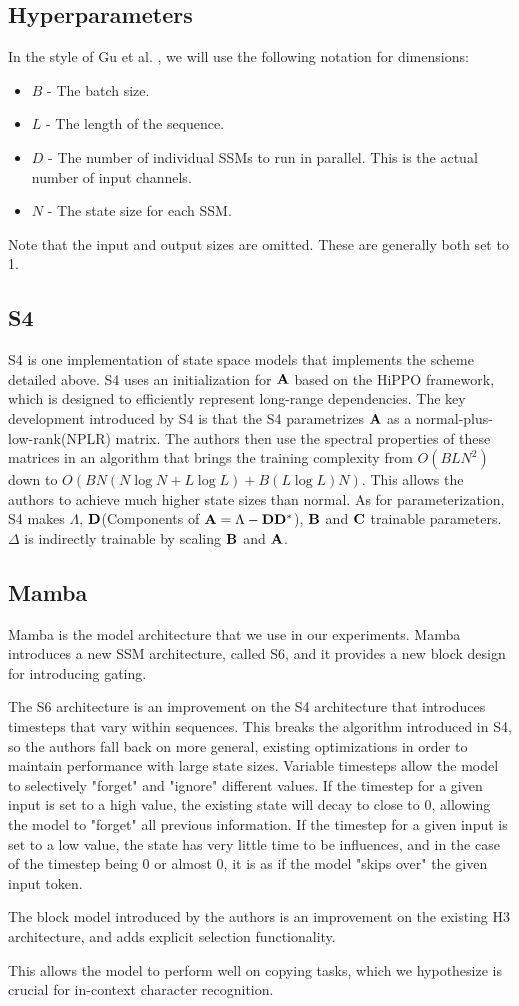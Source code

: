 \subsection{Hyperparameters}
In the style of Gu et al. \cite{s4}, we will use the following notation for
dimensions:
\begin{itemize}
    \item $B$ - The batch size.
    \item $L$ - The length of the sequence.
    \item $D$ - The number of individual SSMs to run in parallel. This is the
    actual number of input channels.
    \item $N$ - The state size for each SSM.
\end{itemize}
Note that the input and output sizes are omitted.
These are generally both set to 1.

\subsection{S4}
S4\cite{s4} is one implementation of state space models that implements the
scheme detailed above.
S4 uses an initialization for ${\mathbf{A}}$ based on the HiPPO framework, which is
designed to efficiently represent long-range dependencies.
The key development introduced by S4 is that the S4 parametrizes ${\mathbf{A}}$ as a
normal-plus-low-rank(NPLR) matrix. The authors then use the spectral properties
of these matrices in an algorithm that brings the training complexity from
$O(BLN^2)$ down to $O(BN(N \log N + L \log L) + B(L \log L)N)$\cite{s4}.
This allows the authors to achieve much higher state sizes than normal.
As for parameterization, S4 makes $\Lambda$, ${\mathbf{D}}$(Components of
${\mathbf{A}} = \Lambda - {\mathbf{D}}{\mathbf{D}}^*$), ${\mathbf{B}}$ and ${\mathbf{C}}$ trainable parameters.
$\Delta$ is indirectly trainable by scaling ${\mathbf{B}}$ and ${\mathbf{A}}$.

\subsection{Mamba}
Mamba\cite{mamba} is the model architecture that we use in our experiments.
Mamba introduces a new SSM architecture, called S6, and it provides a new block
design for introducing gating.

The S6 architecture is an improvement on the S4 architecture that introduces
timesteps that vary within sequences.
This breaks the algorithm introduced in S4, so the authors fall back on more
general, existing optimizations in order to maintain performance with large
state sizes.
Variable timesteps allow the model to selectively "forget" and "ignore"
different values.
If the timestep for a given input is set to a high value, the existing state
will decay to close to 0, allowing the model to "forget" all previous information.
If the timestep for a given input is set to a low value, the state has very little
time to be influences, and in the case of the timestep being 0 or almost 0, it
is as if the model "skips over" the given input token.

The block model introduced by the authors is an improvement on the existing
H3\cite{h3} architecture, and adds explicit selection functionality.

This allows the model to perform well on copying tasks, which we hypothesize
is crucial for in-context character recognition.
